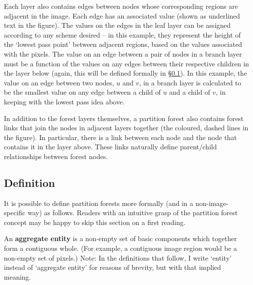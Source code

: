 Each layer also contains edges between nodes whose corresponding regions are adjacent in the image. Each edge has an associated value (shown as underlined text in the figure). The values on the edges in the leaf layer can be assigned according to any scheme desired -- in this example, they represent the height of the `lowest pass point' between adjacent regions, based on the values associated with the pixels. The value on an edge between a pair of nodes in a branch layer must be a function of the values on any edges between their respective children in the layer below (again, this will be defined formally in \S\ref{sec:ipfs-definition}). In this example, the value on an edge between two nodes, $u$ and $v$, in a branch layer is calculated to be the smallest value on any edge between a child of $u$ and a child of $v$, in keeping with the lowest pass idea above.

In addition to the forest layers themselves, a partition forest also contains forest links that join the nodes in adjacent layers together (the coloured, dashed lines in the figure). In particular, there is a link between each node and the node that contains it in the layer above. These links naturally define parent/child relationships between forest nodes.




\subsection{Definition}
\label{sec:ipfs-definition}


It is possible to define partition forests more formally (and in a non-image-specific way) as follows. Readers with an intuitive grasp of the partition forest concept may be happy to skip this section on a first reading.

\begin{definition}
An \textbf{aggregate entity} is a non-empty set of basic components which together form a contiguous whole. (For example, a contiguous image region would be a non-empty set of pixels.) Note: In the definitions that follow, I write `entity' instead of `aggregate entity' for reasons of brevity, but with that implied meaning.
\end{definition}

